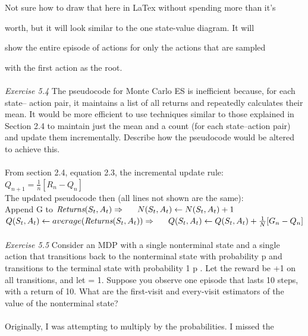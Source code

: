 \documentclass{article}
\begin{document}
Not sure how to draw that here in LaTex without spending more than it's 

worth, but it will look similar to the one state-value diagram. It will 

show the entire episode of actions for only the actions that are sampled 

with the first action as the root.
\\\\
\textit{Exercise 5.4} The pseudocode for Monte Carlo ES is inefficient because, for each state–
action pair, it maintains a list of all returns and repeatedly calculates their mean. It would
be more efficient to use techniques similar to those explained in Section 2.4 to maintain
just the mean and a count (for each state–action pair) and update them incrementally.
Describe how the pseudocode would be altered to achieve this.  
\\
\\
From section 2.4, equation 2.3, the incremental update rule:\\

$Q_{n+1} = \frac{1}{n}[R_{n} - Q_{n}]$ \\

The updated pseudocode then (all lines not shown are the same): \\

Append G to $\textit{Returns}(S_{t}, A_{t}) \Rightarrow \\
\indent N(S_{t}, A_{t}) \leftarrow N(S_{t}, A_{t}) + 1$
\\

$Q(S_{t}, A_{t}) \leftarrow average(\textit{Returns}(S_{t}, A_{t})) \Rightarrow\\
\indent Q(S_{t}, A_{t}) \leftarrow Q(S_{t}, A_{t}) + \frac{1}{N}[G_{n} - Q_{n}]$
\\\\
\textit{Exercise 5.5} Consider an MDP with a single nonterminal state and a single action
that transitions back to the nonterminal state with probability p and transitions to the
terminal state with probability 1 p . Let the reward be +1 on all transitions, and let
 = 1. Suppose you observe one episode that lasts 10 steps, with a return of 10. What
are the first-visit and every-visit estimators of the value of the nonterminal state?  
\\
\\

Originally, I was attempting to multiply by the probabilities. I missed the 
\end{document}

